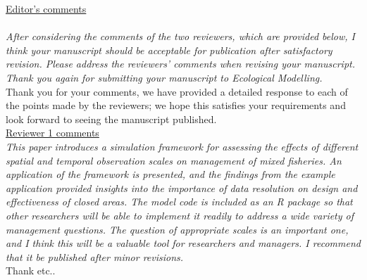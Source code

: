 \documentclass[10pt]{letter}
\begin{document}
\begin{landscape}

\underline{Editor's comments} \\
\\
\textit{
After considering the comments of the two reviewers, which are provided below,
I think your manuscript should be acceptable for publication after satisfactory
revision.  Please address the reviewers' comments when revising your
manuscript.  Thank you again for submitting your manuscript to Ecological
Modelling.
} \\

Thank you for your comments, we have provided a detailed response to each of
the points made by the reviewers; we hope this satisfies your requirements and
look forward to seeing the manuscript published. \\


\underline{Reviewer 1 comments} \\

\textit{This paper introduces a simulation framework for assessing the effects
	of different spatial and temporal observation scales on management of
	mixed fisheries. An application of the framework is presented, and the
	findings from the example application provided insights into the
	importance of data resolution on design and effectiveness of closed
	areas. The model code is included as an R package so that other
	researchers will be able to implement it readily to address a wide
	variety of management questions. The question of appropriate scales is
	an important one, and I think this will be a valuable tool for
	researchers and managers. I recommend that it be published after minor
	revisions.} \\

Thank etc..


\end{landscape}
\end{document}
